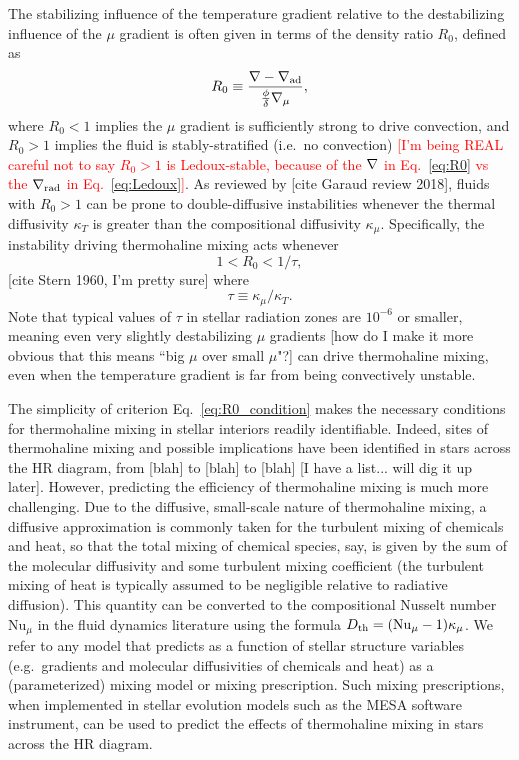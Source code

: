 The stabilizing influence of the temperature gradient relative to the destabilizing influence of the $\mu$ gradient is often given in terms of the density ratio $R_0$, defined as
\begin{equation} \label{eq:R0}
    R_0 \equiv \frac{\grad - \gradad}{\frac{\phi}{\delta} \gradmu},
\end{equation}
where $R_0 < 1$ implies the $\mu$ gradient is sufficiently strong to drive convection, and $R_0 > 1$ implies the fluid is stably-stratified (i.e.~no convection) \textcolor{red}{[I'm being REAL careful not to say $R_0 > 1$ is Ledoux-stable, because of the $\nabla$ in Eq.~\eqref{eq:R0} vs the $\nabla_{\rm{rad}}$ in Eq.~\eqref{eq:Ledoux}]}. 
As reviewed by [cite Garaud review 2018], fluids with $R_0 > 1$ can be prone to double-diffusive instabilities whenever the thermal diffusivity $\kappa_T$ is greater than the compositional diffusivity $\kappa_\mu$. Specifically, the instability driving thermohaline mixing acts whenever
\begin{equation} \label{eq:R0_condition}
1 < R_0 < 1/\tau,
\end{equation}
[cite Stern 1960, I'm pretty sure] where
\begin{equation} \label{eq:tau}
    \tau \equiv \kappa_\mu/\kappa_T.
\end{equation}
Note that typical values of $\tau$ in stellar radiation zones are $10^{-6}$ or smaller, meaning even very slightly destabilizing $\mu$ gradients [how do I make it more obvious that this means ``big $\mu$ over small $\mu$"?] can drive thermohaline mixing, even when the temperature gradient is far from being convectively unstable.

The simplicity of criterion Eq.~\eqref{eq:R0_condition} makes the necessary conditions for thermohaline mixing in stellar interiors readily identifiable. 
Indeed, sites of thermohaline mixing and possible implications have been identified in stars across the HR diagram, from [blah] to [blah] to [blah] [I have a list... will dig it up later]. 
However, predicting the efficiency of thermohaline mixing is much more challenging. 
Due to the diffusive, small-scale nature of thermohaline mixing, a diffusive approximation is commonly taken for the turbulent mixing of chemicals and heat, so that the total mixing of chemical species, say, is given by the sum of the molecular diffusivity and some turbulent mixing coefficient \Dth (the turbulent mixing of heat is typically assumed to be negligible relative to radiative diffusion). 
This quantity can be converted to the compositional Nusselt number $\mathrm{Nu}_{\mu}$ in the fluid dynamics literature using the formula $D_\mathrm{th} = (\mathrm{Nu}_{\mu} - 1)\kappa_\mu$. 
We refer to any model that predicts \Dth as a function of stellar structure variables (e.g.~gradients and molecular diffusivities of chemicals and heat) as a (parameterized) mixing model or mixing prescription. 
Such mixing prescriptions, when implemented in stellar evolution models such as the MESA software instrument, can be used to predict the effects of thermohaline mixing in stars across the HR diagram.

